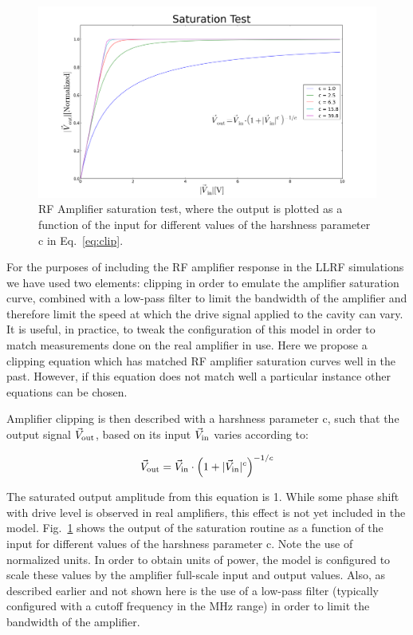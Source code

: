 \documentclass[a4paper,12pt]{article}
\begin{document}
\begin{figure}
\centering
\includegraphics[scale=0.35]{../figures/saturation_test.png}
\caption{RF Amplifier saturation test, where the output is plotted as a function of the input for different values of the harshness parameter c in Eq.~\ref{eq:clip}.}
\label{fig:saturation_test}
\end{figure}

For the purposes of including the RF amplifier response in the LLRF simulations we have used two elements: clipping in order to emulate the amplifier saturation curve, combined with a low-pass filter to limit the bandwidth of the amplifier and therefore limit the speed at which the drive signal applied to the cavity can vary. It is useful, in practice, to tweak the configuration of this model in order to match measurements done on the real amplifier in use. Here we propose a clipping equation which has matched RF amplifier saturation curves well in the past. However, if this equation does not match well a particular instance other equations can be chosen.

Amplifier clipping is then described with a harshness parameter c, such that the output signal $\vec V_{\rm out}$, based on its input $\vec V_{\rm in}$ varies according to:

\begin{equation}
  \vec V_{\rm out} = \vec V_{\rm in} \cdot \left(1 + |\vec V_{\rm in}|^c\right)^{-1/c}
  \label{eq:clip}
\end{equation}

The saturated output amplitude from this equation is 1. While some phase shift with drive level is observed in real amplifiers, this effect is not yet included in the model. Fig.~\ref{fig:saturation_test} shows the output of the saturation routine as a function of the input for different values of the harshness parameter c. Note the use of normalized units. In order to obtain units of power, the model is configured to scale these values by the amplifier full-scale input and output values. Also, as described earlier and not shown here is the use of a low-pass filter (typically configured with a cutoff frequency in the MHz range) in order to limit the bandwidth of the amplifier.
\end{document}
